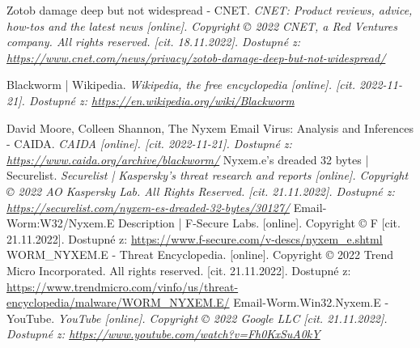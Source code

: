 \documentclass[a4paper,12pt]{article}
\begin{document}
{	
	{
		Zotob damage deep but not widespread - CNET. 
		\it{CNET: Product reviews, advice, how-tos and the latest news}
		[online]. Copyright © 2022 CNET, a Red Ventures company. All rights reserved. [cit. 18.11.2022].
		Dostupné z: \url{https://www.cnet.com/news/privacy/zotob-damage-deep-but-not-widespread/}
	}
	
	{
		Blackworm | Wikipedia.
		\it{Wikipedia, the free encyclopedia} [online]. [cit. 2022-11-21].
		Dostupné z: \url{https://en.wikipedia.org/wiki/Blackworm}
	}
	
	{
		David Moore, Colleen Shannon,
		The Nyxem Email Virus: Analysis and Inferences - CAIDA.
		\it{CAIDA} [online]. [cit. 2022-11-21].
		Dostupné z: \url{https://www.caida.org/archive/blackworm/}
	}
	{
		Nyxem.e’s dreaded 32 bytes | Securelist.
		\it{Securelist | Kaspersky’s threat research and reports} [online].
		Copyright © 2022 AO Kaspersky Lab. All Rights Reserved. [cit. 21.11.2022].
		Dostupné z: \url{https://securelist.com/nyxem-es-dreaded-32-bytes/30127/}
	}
	{
		Email-Worm:W32/Nyxem.E Description | F-Secure Labs.
		[online]. Copyright © F [cit. 21.11.2022].
		Dostupné z: \url{https://www.f-secure.com/v-descs/nyxem_e.shtml}
	}
	{
		WORM\_NYXEM.E - Threat Encyclopedia.
		[online]. Copyright © 2022 Trend Micro Incorporated. All rights reserved.
		[cit. 21.11.2022].
		Dostupné z: \url{https://www.trendmicro.com/vinfo/us/threat-encyclopedia/malware/WORM_NYXEM.E/}
	}
	{
		Email-Worm.Win32.Nyxem.E - YouTube.
		\it{YouTube} [online]. Copyright © 2022 Google LLC [cit. 21.11.2022].
		Dostupné z: \url{https://www.youtube.com/watch?v=Fh0KxSuA0kY}
	}
}





\seznamobr  %


\seznamtab  %




\end{document}
